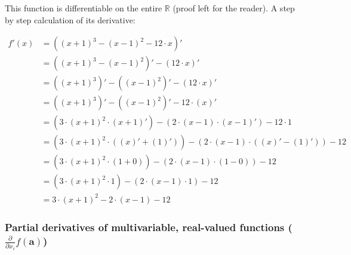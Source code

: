 \documentclass{article}
\begin{document}
            This function is differentiable on the entire $\mathbb{R}$ (proof
            left for the reader). A step by step calculation of its derivative:

            \begin{align*}
              f'(x) & = \left( (x+1)^3 - (x-1)^2 - 12 \cdot x \right)' \\
                    & = \left( (x+1)^3 - (x-1)^2 \right)' - (12 \cdot x)' \\
                    & = \left( (x+1)^3 \right)'
                        -
                        \left( (x-1)^2 \right)'
                        - (12 \cdot x)' \\
                    & = \left( (x+1)^3 \right)'
                        -
                        \left( (x-1)^2 \right)'
                        - 12 \cdot (x)' \\
                    & = \left( 3 \cdot (x+1)^2 \cdot (x+1)' \right)
                        -
                        \left( 2 \cdot (x-1) \cdot (x-1)' \right)
                        - 12 \cdot 1 \\
                    & = \left(
                          3 \cdot (x+1)^2 \cdot \left( (x)' + (1)' \right)
                        \right)
                        -
                        \left(
                          2 \cdot (x-1) \cdot \left( (x)' - (1)' \right)
                        \right)
                        - 12 \\
                    & = \left(
                          3 \cdot (x+1)^2 \cdot \left( 1 + 0 \right)
                        \right)
                        -
                        \left(
                          2 \cdot (x-1) \cdot \left( 1 - 0 \right)
                        \right)
                        - 12 \\
                    & = \left( 3 \cdot (x+1)^2 \cdot 1 \right)
                        -
                        \left( 2 \cdot (x-1) \cdot 1 \right)
                        - 12 \\
                    & = 3 \cdot (x+1)^2 - 2 \cdot (x-1) - 12
            \end{align*}

        \subsubsection{%
          Partial derivatives of multivariable, real-valued functions
          ($\frac{\partial}{\partial x_i} f(\mathbf{a})$)
        }
\end{document}
